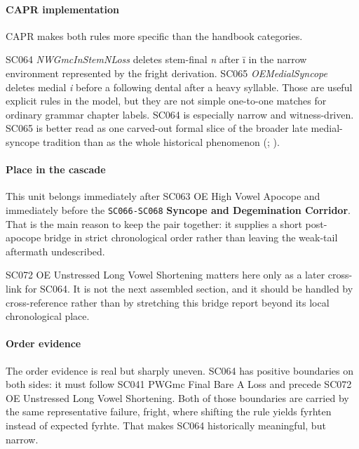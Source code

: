 \documentclass[
  british,
  a4paper,
]{article}
\begin{document}
\paragraph{CAPR implementation}\label{capr-implementation-41}

CAPR makes both rules more specific than the handbook categories.

SC064 \emph{NWGmcInStemNLoss} deletes stem-final \emph{n} after ī in the
narrow environment represented by the fright derivation. SC065
\emph{OEMedialSyncope} deletes medial \emph{i} before a following dental
after a heavy syllable. Those are useful explicit rules in the model,
but they are not simple one-to-one matches for ordinary grammar chapter
labels. SC064 is especially narrow and witness-driven. SC065 is better
read as one carved-out formal slice of the broader late medial-syncope
tradition than as the whole historical phenomenon
(;
).

\paragraph{Place in the cascade}\label{place-in-the-cascade-41}

This unit belongs immediately after SC063 OE High Vowel Apocope and
immediately before the \texttt{SC066-SC068} \textbf{Syncope and
Degemination Corridor}. That is the main reason to keep the pair
together: it supplies a short post-apocope bridge in strict
chronological order rather than leaving the weak-tail aftermath
undescribed.

SC072 OE Unstressed Long Vowel Shortening matters here only as a later
cross-link for SC064. It is not the next assembled section, and it
should be handled by cross-reference rather than by stretching this
bridge report beyond its local chronological place.

\paragraph{Order evidence}\label{order-evidence-41}

The order evidence is real but sharply uneven. SC064 has positive
boundaries on both sides: it must follow SC041 PWGmc Final Bare A Loss
and precede SC072 OE Unstressed Long Vowel Shortening. Both of those
boundaries are carried by the same representative failure, fright, where
shifting the rule yields fyrhten instead of expected fyrhte. That makes
SC064 historically meaningful, but narrow.
\end{document}
